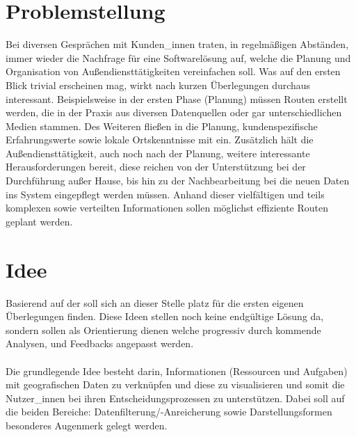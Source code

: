 \documentclass[Bachelorarbeit.tex]{subfiles}
\begin{document}
\section{Problemstellung}
\label{chap:einfuehrung:sec:problemstellung}

Bei diversen Gesprächen mit Kunden\_innen traten, in regelmäßigen Abständen, immer wieder die Nachfrage für eine Softwarelösung auf, welche die Planung und Organisation von Außendiensttätigkeiten vereinfachen soll. 
Was auf den ersten Blick trivial erscheinen mag, wirkt nach kurzen Überlegungen durchaus interessant. 
Beispielsweise in der ersten Phase (Planung) müssen Routen erstellt werden, die in der Praxis aus diversen Datenquellen oder gar unterschiedlichen Medien stammen. 
Des Weiteren fließen in die Planung, kundenspezifische Erfahrungswerte sowie lokale Ortskenntnisse mit ein.
Zusätzlich hält die Außendiensttätigkeit, auch noch nach der Planung, weitere interessante Herausforderungen bereit, diese reichen von der Unterstützung bei der Durchführung außer Hause,  bis hin zu der Nachbearbeitung bei die neuen Daten ins System eingepflegt werden müssen.
Anhand dieser vielfältigen und teils komplexen sowie verteilten Informationen sollen möglichst effiziente Routen geplant werden. 


\begin{comment}
Als Grundlage für den Prototypen dient die Software Pery der Firma Perfany GmbH. 
Dabei handelt es sich um 
Wobei der Fokus auf dem Ticket Modul der Software ruht. Dabei ist das Anwendungskonzept des Moduls so ausgelegt das sämtliche Aufgaben, die die Firma betreffen , einzeln als Tickets erfasst werden. 
\end{comment}

\section{Idee}
\label{chap:einfuehrung:sec:idee}

Basierend auf der  soll sich an dieser Stelle platz für die ersten eigenen Überlegungen finden. 
Diese Ideen stellen noch keine endgültige Lösung da, sondern sollen als Orientierung dienen welche progressiv durch kommende Analysen,  und Feedbacks angepasst werden.\\
\\
Die grundlegende Idee besteht darin, Informationen (Ressourcen und Aufgaben) mit geografischen Daten zu verknüpfen und diese zu visualisieren und somit die Nutzer\_innen bei ihren Entscheidungsprozessen zu unterstützen. 
Dabei soll auf die beiden Bereiche: Datenfilterung/-Anreicherung sowie Darstellungsformen besonderes Augenmerk gelegt werden.
\end{document}
